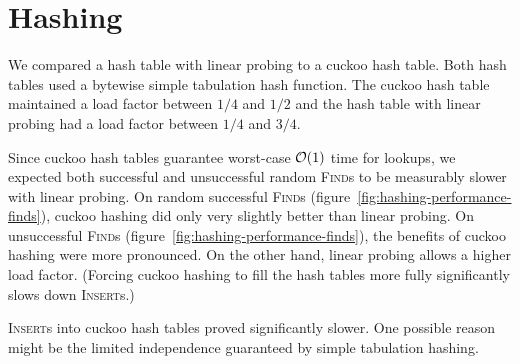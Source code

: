 \section{Hashing}
\label{sec:hashing-results}
We compared a hash table with linear probing to a cuckoo hash table.
Both hash tables used a bytewise simple tabulation hash function.
The cuckoo hash table maintained a load factor between $1/4$ and
$1/2$ and the hash table with linear probing had a load factor
between $1/4$ and $3/4$.

Since cuckoo hash tables guarantee worst-case $\mathcal{O}(1)$ time for lookups,
we expected both successful and unsuccessful random \textsc{Find}s to be
measurably slower with linear probing.
On random successful \textsc{Find}s (figure~\ref{fig:hashing-performance-finds}),
cuckoo hashing did only very slightly better than linear probing.
On unsuccessful \textsc{Find}s (figure~\ref{fig:hashing-performance-finds}),
the benefits of cuckoo hashing were more pronounced.
On the other hand, linear probing allows a higher load factor.
(Forcing cuckoo hashing to fill the hash tables more fully significantly
slows down \textsc{Insert}s.)

\textsc{Insert}s into cuckoo hash tables proved significantly slower.
One possible reason might be the limited independence guaranteed by simple
tabulation hashing.

